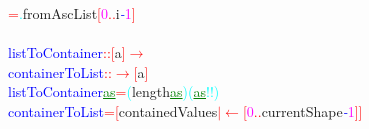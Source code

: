 \textcolor{red}{=}\textcolor{cyan}{.}{\rm{}fromAscList}\hsspace \textcolor{red}{[}\textcolor{magenta}{0}\textcolor{red}{..}{\rm{}i}\textcolor{blue}{{\it{}-}}\textcolor{magenta}{1}\textcolor{red}{]}\\\\\textcolor{blue}{listToContainer}\hsspace \textcolor{red}{::}\hsspace \textcolor{red}{[}{\rm{}a}\textcolor{red}{]}\hsspace \textcolor{red}{\ensuremath{\rightarrow}}\\\textcolor{blue}{containerToList}\hsspace \textcolor{red}{::}\hsspace \textcolor{red}{\ensuremath{\rightarrow}}\hsspace \textcolor{red}{[}{\rm{}a}\textcolor{red}{]}\\\textcolor{blue}{listToContainer}\hsspace \textcolor{green}{\underline{as}}\hsspace \textcolor{red}{=}\hsspace \textcolor{cyan}{(}{\rm{}length}\hsspace \textcolor{green}{\underline{as}}\textcolor{cyan}{)}\hsspace \textcolor{cyan}{(}\textcolor{green}{\underline{as}}\textcolor{cyan}{!!}\textcolor{cyan}{)}\\\textcolor{blue}{containerToList}\hsspace \hsspace \textcolor{red}{=}\hsspace \textcolor{red}{[}{\rm{}containedValues}\hsspace \textcolor{red}{\ensuremath{|}}\hsspace \textcolor{red}{\ensuremath{\leftarrow}}\hsspace \textcolor{red}{[}\textcolor{magenta}{0}\textcolor{red}{..}{\rm{}currentShape}\textcolor{blue}{{\it{}-}}\textcolor{magenta}{1}\textcolor{red}{]}\textcolor{red}{]}\\
